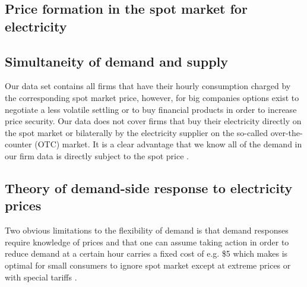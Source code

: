 \label{sec:theory}
\subsection{Price formation in the spot market for electricity}
\label{subsec:t_price}


\subsection{Simultaneity of demand and supply}
\label{subsec:t_simultaneity}
Our data set contains all firms that have their hourly consumption charged by the corresponding spot market price, however, for big companies options exist to negotiate a less volatile settling or to buy financial products in order to increase price security. Our data does not cover firms that buy their electricity directly on the spot market or bilaterally by the electricity supplier on the so-called over-the-counter (OTC) market. It is a clear advantage that we know all of the demand in our firm data is directly subject to the spot price \citep{lijesen2007real}.


\subsection{Theory of demand-side response to electricity prices}
\label{subsec:t_demand}
Two obvious limitations to the flexibility of demand is that demand responses require knowledge of prices and that one can assume taking action in order to reduce demand at a certain hour carries a fixed cost of e.g. \$5 which makes is optimal for small consumers to ignore spot market except at extreme prices or with special tariffs \citep{wolak2011residential}. 





